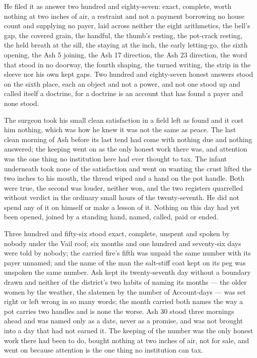 He filed it as answer two hundred and eighty-seven: exact, complete, worth nothing at two inches of air, a restraint and not a payment borrowing no house count and supplying no payer, laid across neither the eight arithmetics, the bell's gap, the covered grain, the handful, the thumb's resting, the pot-crack resting, the held breath at the sill, the staying at the inch, the early letting-go, the sixth opening, the Ash 5 joining, the Ash 17 direction, the Ash 23 direction, the word that stood in no doorway, the fourth shaping, the turned writing, the strip in the sleeve nor his own kept gaps. Two hundred and eighty-seven honest answers stood on the sixth place, each an object and not a power, and not one stood up and called itself a doctrine, for a doctrine is an account that has found a payer and none stood.

The surgeon took his small clean satisfaction in a field left as found and it cost him nothing, which was how he knew it was not the same as peace. The last clean morning of Ash before its last tend had come with nothing due and nothing answered; the keeping went on as the only honest work there was, and attention was the one thing no institution here had ever thought to tax. The infant underneath took none of the satisfaction and went on wanting the crust lifted the two inches to his mouth, the thread wiped and a hand on the pot handle. Both were true, the second was louder, neither won, and the two registers quarrelled without verdict in the ordinary small hours of the twenty-seventh. He did not spend any of it on himself or make a lesson of it. Nothing on this day had yet been opened, joined by a standing hand, named, called, paid or ended.

Three hundred and fifty-six stood exact, complete, unspent and spoken by nobody under the Vail roof; six months and one hundred and seventy-six days were told by nobody; the carried fire's fifth was unpaid the same number with its payer unnamed; and the name of the man the salt-stiff coat kept on its peg was unspoken the same number. Ash kept its twenty-seventh day without a boundary drawn and neither of the district's two habits of naming its months --- the older women by the weather, the slatemen by the number of Account-days --- was set right or left wrong in so many words; the month carried both names the way a pot carries two handles and is none the worse. Ash 30 stood three mornings ahead and was named only as a date, never as a promise, and was not brought into a day that had not earned it. The keeping of the number was the only honest work there had been to do, bought nothing at two inches of air, not for sale, and went on because attention is the one thing no institution can tax.

